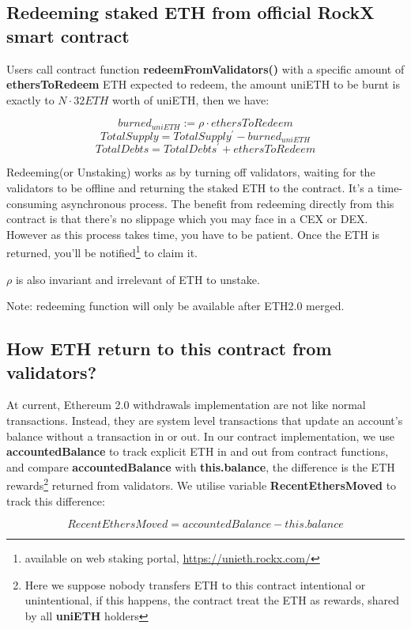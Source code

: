 \documentclass{article}
\begin{document}
\subsection{Redeeming staked ETH from official RockX smart contract}
Users call contract function \textbf{redeemFromValidators()} with a specific amount of \textbf{ethersToRedeem} ETH expected to redeem, the amount uniETH to be burnt is exactly to $N\cdot 32ETH$ worth of uniETH, then we have:
\begin{theorem}
\label{Redeem}
\[burned_{uniETH} := \rho \cdot ethersToRedeem \]
\[TotalSupply = TotalSupply^{\prime} - burned_{uniETH} \]
\[TotalDebts = TotalDebts^{\prime} + ethersToRedeem\]
\end{theorem}
Redeeming(or Unstaking) works as by turning off validators, waiting for the validators to be offline and returning the staked ETH to the contract. It's a time-consuming asynchronous process. The benefit from redeeming directly from this contract is that there's no slippage which you may face in a CEX or DEX. However as this process takes time, you have to be patient. Once the ETH is returned, you'll be notified\footnote{available on web staking portal, \url{https://unieth.rockx.com/}} to claim it.

$\rho$ is also invariant and irrelevant of ETH to unstake.

Note: redeeming function will only be available after ETH2.0 merged.

\subsection{How ETH return to this contract from validators? }
\label{sectionAccounting}

At current, Ethereum 2.0 withdrawals implementation are not like normal transactions. Instead, they are system level transactions that update an account's balance without a transaction in or out. In our contract implementation, we use \textbf{accountedBalance} to track explicit ETH in and out from contract functions, and compare \textbf{accountedBalance} with \textbf{this.balance}, the difference is the ETH rewards\footnote{Here we suppose nobody transfers ETH to this contract intentional or unintentional, if this happens, the contract treat the ETH as rewards, shared by all \textbf{uniETH} holders} returned from validators. We utilise variable \textbf{RecentEthersMoved} to track this difference:

\[RecentEthersMoved = accountedBalance - this.balance\]
\end{document}
